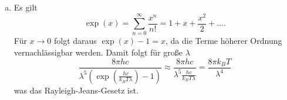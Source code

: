 \begin{enumerate}[(a)]
\item Es gilt 
\begin{equation}
  \exp(x)=\sum_{n=0}^{\infty}\frac{x^n}{n!}=1+x+\frac{x^2}{2}+\dots.
\end{equation}
Für $x\to0$ folgt daraus $\exp(x)-1=x$, da die Terme höherer Ordnung vernachlässigbar werden.
Damit folgt für große $\lambda$
\begin{equation}
  \frac{8\pi hc}{\lambda^5\left(\exp\left(\frac{hc}{k_BT\lambda}\right)-1\right)}\approx\frac{8\pi hc}{\lambda^5\frac{hc}{k_BT\lambda}}=\frac{8\pi k_BT}{\lambda^4}
\end{equation}
was das Rayleigh-Jeans-Gesetz ist.


\end{enumerate}